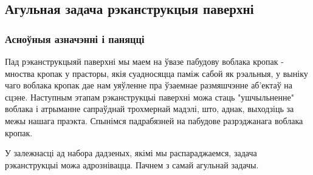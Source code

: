 \subsection*{Агульная задача рэканструкцыя паверхні}

\subsubsection*{Асноўныя азначэнні і паняцці}
Пад рэканструкцыяй паверхні мы маем на ўвазе пабудову воблака кропак - мноства кропак у прасторы, якія суадносяцца паміж сабой як рэальныя, у выніку чаго воблака кропак дае нам уяўленне пра ўзаемнае размяшчэнне аб'ектаў на сцэне. Наступным этапам рэканструкцыі паверхні можа стаць "ушчыльненне" воблака і атрыманне сапраўднай трохмернай мадэлі, што, аднак, выходзіць за межы нашага праэкта. Спынімся падрабязней на пабудове разрэджанага воблака кропак. \par
У залежнасці ад набора дадзеных, якімі мы распараджаемся, задача рэканструкцыі можа адрознівацца. Пачнем з самай агульнай задачы. \par

\vspace{5mm}

